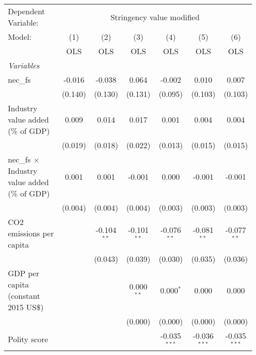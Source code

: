
\begingroup
\centering
\begin{tabular}{lcccccc}
   \toprule
   Dependent Variable: & \multicolumn{6}{c}{Stringency value modified}\\
   Model:                                               & (1)     & (2)           & (3)           & (4)            & (5)            & (6)\\  
                                                        &  OLS    & OLS           & OLS           & OLS            & OLS            & OLS\\  
   \midrule
   \emph{Variables}\\
   nec\_fs                                              & -0.016  & -0.038        & 0.064         & -0.002         & 0.010          & 0.007\\   
                                                        & (0.140) & (0.130)       & (0.131)       & (0.095)        & (0.103)        & (0.103)\\   
   Industry value added (\% of GDP)                     & 0.009   & 0.014         & 0.017         & 0.001          & 0.004          & 0.004\\   
                                                        & (0.019) & (0.018)       & (0.022)       & (0.013)        & (0.015)        & (0.015)\\   
   nec\_fs $\times$ Industry value added (\% of GDP)    & 0.001   & 0.001         & -0.001        & 0.000          & -0.001         & -0.001\\   
                                                        & (0.004) & (0.004)       & (0.004)       & (0.003)        & (0.003)        & (0.003)\\   
   CO2 emissions per capita                             &         & -0.104$^{**}$ & -0.101$^{**}$ & -0.076$^{**}$  & -0.081$^{**}$  & -0.077$^{**}$\\   
                                                        &         & (0.043)       & (0.039)       & (0.030)        & (0.035)        & (0.036)\\   
   GDP per capita (constant 2015 US\$)                  &         &               & 0.000$^{**}$  & 0.000$^{*}$    & 0.000          & 0.000\\   
                                                        &         &               & (0.000)       & (0.000)        & (0.000)        & (0.000)\\   
   Polity score                                         &         &               &               & -0.035$^{***}$ & -0.036$^{***}$ & -0.035$^{***}$\\   

\end{tabular}
